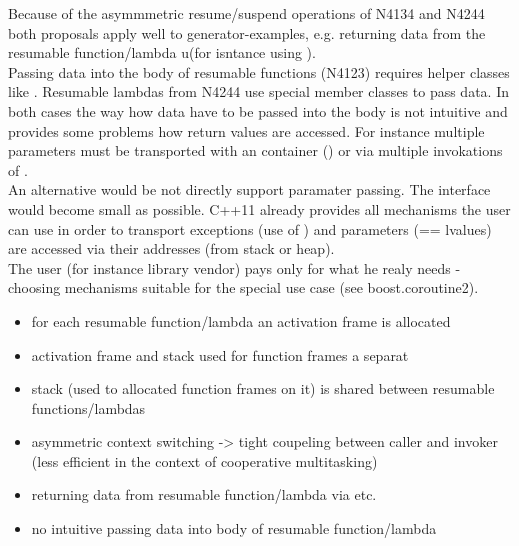 Because of the asymmmetric resume/suspend operations of N4134 and N4244 both
proposals apply well to generator-examples, e.g. returning data from the
resumable function/lambda u(for isntance using \yield).\\
Passing data into the body of resumable functions (N4123) requires helper
classes like .
Resumable lambdas from N4244 use special member classes
 to pass data.
In both cases the way how data have to be passed into the body is not intuitive
and provides some problems how return values are accessed. For instance multiple
parameters must be transported with an container () or via
multiple invokations of
.\\
\newline
An alternative would be not directly support paramater passing. The interface
would become small as possible. C++11 already provides all mechanisms the user
can use in order to transport exceptions (use of ) and
parameters (== lvalues) are accessed via their addresses (from stack or heap).\\
The user (for instance library vendor) pays only for what he realy needs -
choosing mechanisms suitable for the special use case (see
boost.coroutine2\cite{bcoroutine2}).

\begin{itemize}
    \item   for each resumable function/lambda an activation frame is allocated
    \item   activation frame and stack used for function frames a separat
    \item   stack (used to allocated function frames on it) is shared between
            resumable functions/lambdas
    \item   asymmetric context switching -> tight coupeling between caller and
            invoker (less efficient in the context of cooperative multitasking)
    \item   returning data from resumable function/lambda via \yield etc.
    \item   no intuitive passing data into body of resumable function/lambda
\end{itemize}

